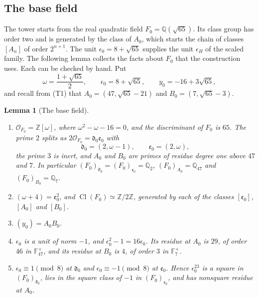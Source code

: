 \documentclass[11pt]{article}
\theoremstyle{plain}
\newtheorem{lemma}[theorem]{Lemma}
\theoremstyle{definition}
\theoremstyle{remark}
\DeclareMathOperator{\Cl}{Cl}
\newcommand{\Z}{\mathbb Z}
\newcommand{\Q}{\mathbb Q}
\newcommand{\F}{\mathbb F}
\newcommand{\OO}{\mathcal O}
\begin{document}
\subsection{The base field}\label{sec:base-field}

The tower starts from the real quadratic field $F_0=\Q(\sqrt{65})$.  Its
class group has order two and is generated by the class of $A_0$, which
starts the chain of classes $[A_n]$ of order $2^{n+1}$.  The unit
$\epsilon_0=8+\sqrt{65}$ supplies the unit $\epsilon_H$ of the scaled
family.  The following lemma collects the facts about $F_0$ that the
construction uses.  Each can be checked by hand.  Put
\[
 \omega=\frac{1+\sqrt{65}}2,\qquad \epsilon_0=8+\sqrt{65},\qquad
 y_0=-16+3\sqrt{65},
\]
and recall from (T1) that $A_0=(47,\sqrt{65}-21)$ and
$B_0=(7,\sqrt{65}-3)$.

\begin{lemma}[The base field]\label{lem:base-field}
\begin{enumerate}
\item[\textup{(a)}] $\OO_{F_0}=\Z[\omega]$, where $\omega^2-\omega-16=0$,
and the discriminant of $F_0$ is $65$.  The prime $2$ splits as
$2\OO_{F_0}=\mathfrak d_0\mathfrak e_0$ with
\[
 \mathfrak d_0=(2,\omega-1),\qquad \mathfrak e_0=(2,\omega),
\]
the prime $3$ is inert, and $A_0$ and $B_0$ are primes of residue degree
one above $47$ and $7$.  In particular
$(F_0)_{\mathfrak d_0}=(F_0)_{\mathfrak e_0}=\Q_2$,
$(F_0)_{A_0}=\Q_{47}$ and $(F_0)_{B_0}=\Q_7$.
\item[\textup{(b)}] $(\omega+4)=\mathfrak e_0^2$, and
$\Cl(F_0)\simeq\Z/2\Z$, generated by each of the classes $[\mathfrak e_0]$,
$[A_0]$ and $[B_0]$.
\item[\textup{(c)}] $(y_0)=A_0B_0$.
\item[\textup{(d)}] $\epsilon_0$ is a unit of norm $-1$, and
$\epsilon_0^2-1=16\epsilon_0$.  Its residue at $A_0$ is $29$, of order
$46$ in $\F_{47}^\times$, and its residue at $B_0$ is $4$, of order $3$ in
$\F_7^\times$.
\item[\textup{(e)}] $\epsilon_0\equiv1\pmod8$ at $\mathfrak d_0$ and
$\epsilon_0\equiv-1\pmod8$ at $\mathfrak e_0$.  Hence $\epsilon_0^{23}$ is a
square in $(F_0)_{\mathfrak d_0}$, lies in the square class of $-1$ in
$(F_0)_{\mathfrak e_0}$, and has nonsquare residue at $A_0$.
\end{enumerate}
\end{lemma}
\end{document}
